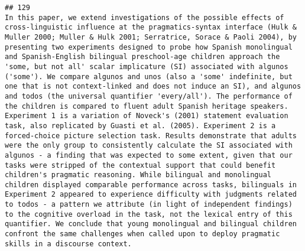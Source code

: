 \documentclass[
  english,
  man]{apa6}
\begin{document}
\begin{verbatim}
## 129                                                                                                                                                                                                                                                                                                                                                                                                                                                                                                                                                                                                                                                                                                                                                                                                                                                                                                                                                                                                        In this paper, we extend investigations of the possible effects of cross-linguistic influence at the pragmatics-syntax interface (Hulk & Muller 2000; Muller & Hulk 2001; Serratrice, Sorace & Paoli 2004), by presenting two experiments designed to probe how Spanish monolingual and Spanish-English bilingual preschool-age children approach the 'some, but not all' scalar implicature (SI) associated with algunos ('some'). We compare algunos and unos (also a 'some' indefinite, but one that is not context-linked and does not induce an SI), and algunos and todos (the universal quantifier 'every/all'). The performance of the children is compared to fluent adult Spanish heritage speakers. Experiment 1 is a variation of Noveck's (2001) statement evaluation task, also replicated by Guasti et al. (2005). Experiment 2 is a forced-choice picture selection task. Results demonstrate that adults were the only group to consistently calculate the SI associated with algunos - a finding that was expected to some extent, given that our tasks were stripped of the contextual support that could benefit children's pragmatic reasoning. While bilingual and monolingual children displayed comparable performance across tasks, bilinguals in Experiment 2 appeared to experience difficulty with judgments related to todos - a pattern we attribute (in light of independent findings) to the cognitive overload in the task, not the lexical entry of this quantifier. We conclude that young monolingual and bilingual children confront the same challenges when called upon to deploy pragmatic skills in a discourse context.

\end{verbatim}
\end{document}
